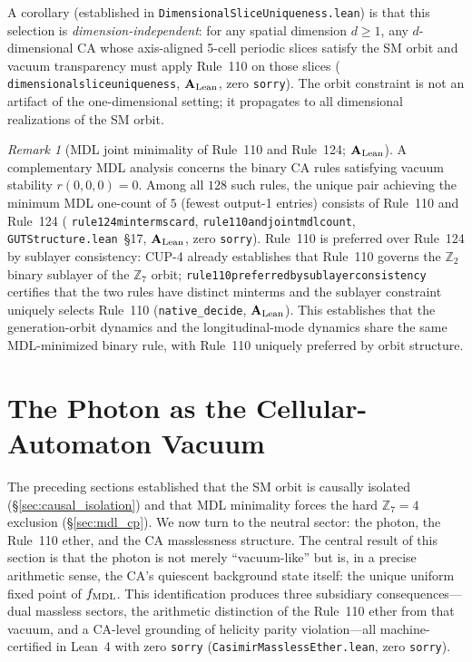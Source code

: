 \documentclass[11pt]{article}
\theoremstyle{remark}
\newtheorem{remark}[theorem]{Remark}
\newcommand{\lean}[1]{%
  \penalty-100
  \begingroup\def\_{\textunderscore\allowbreak}\texttt{#1}\endgroup}
\newcommand{\CatAL}{\ensuremath{\textbf{A}_{\rm Lean}}}
\begin{document}
A corollary (established in \lean{DimensionalSliceUniqueness.lean}) is that this
selection is \emph{dimension-independent}: for any spatial dimension $d \geq 1$,
any $d$-dimensional CA whose axis-aligned 5-cell periodic slices satisfy the SM orbit
and vacuum transparency must apply Rule~110 on those slices
(\lean{dimensional\_slice\_uniqueness}, $\CatAL$, zero \texttt{sorry}).
The orbit constraint is not an artifact of the one-dimensional setting; it propagates
to all dimensional realizations of the SM orbit.

\begin{remark}[MDL joint minimality of Rule~110 and Rule~124; $\CatAL$]
\label{rem:rule124_mdl}
A complementary MDL analysis concerns the binary CA rules satisfying vacuum stability
$r(0,0,0) = 0$.
Among all $128$ such rules, the unique pair achieving the minimum MDL one-count of $5$
(fewest output-1 entries) consists of Rule~110 and Rule~124
(\lean{rule124\_minterms\_card},
\lean{rule110\_and\_124\_joint\_mdl\_count},
\lean{GUTStructure.lean}~\S17, $\CatAL$, zero \texttt{sorry}).
Rule~110 is preferred over Rule~124 by sublayer consistency: CUP-4 already establishes
that Rule~110 governs the $\mathbb{Z}_2$ binary sublayer of the $\mathbb{Z}_7$ orbit;
\lean{rule110\_preferred\_by\_sublayer\_consistency} certifies that the two rules
have distinct minterms and the sublayer constraint uniquely selects Rule~110
(\texttt{native\_decide}, $\CatAL$).
This establishes that the generation-orbit dynamics and the longitudinal-mode dynamics
share the same MDL-minimized binary rule, with Rule~110 uniquely preferred by orbit structure.
\end{remark}

\section{The Photon as the Cellular-Automaton Vacuum}
\label{sec:photon}

The preceding sections established that the SM orbit is causally isolated
(\S\ref{sec:causal_isolation}) and that MDL minimality forces the hard
$\mathbb{Z}_7 = 4$ exclusion (\S\ref{sec:mdl_cp}).
We now turn to the neutral sector: the photon, the Rule~110 ether, and the
CA masslessness structure.
The central result of this section is that the photon is not merely
``vacuum-like'' but is, in a precise arithmetic sense, the CA's quiescent
background state itself: the unique uniform fixed point of $f_{\rm MDL}$.
This identification produces three subsidiary consequences---dual massless
sectors, the arithmetic distinction of the Rule~110 ether from that vacuum,
and a CA-level grounding of helicity parity violation---all machine-certified
in Lean~4 with zero \texttt{sorry}
(\texttt{CasimirMasslessEther.lean}, zero \texttt{sorry}).
\end{document}
